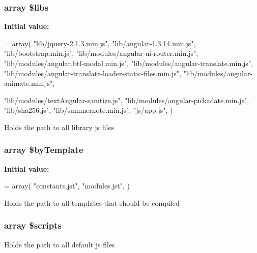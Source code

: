 \subsubsection[{\$libs}]{\setlength{\rightskip}{0pt plus 5cm}array \$libs\hspace{0.3cm}{\ttfamily [static]}}\label{class_scripts_af921b61f4c24e9526d11cb2e6e274f80}
{\bfseries Initial value\+:}
\begin{DoxyCode}
= array(
        \textcolor{stringliteral}{"lib/jquery-2.1.3.min.js"},
        \textcolor{stringliteral}{"lib/angular-1.3.14.min.js"},
        \textcolor{stringliteral}{"lib/bootstrap.min.js"},
        \textcolor{stringliteral}{"lib/modules/angular-ui-router.min.js"},
        \textcolor{stringliteral}{"lib/modules/angular.btf-modal.min.js"},
        \textcolor{stringliteral}{"lib/modules/angular-translate.min.js"},
        \textcolor{stringliteral}{"lib/modules/angular-translate-loader-static-files.min.js"},
        \textcolor{stringliteral}{"lib/modules/angular-animate.min.js"},
        
        \textcolor{stringliteral}{"lib/modules/textAngular-sanitize.js"},
        \textcolor{stringliteral}{"lib/modules/angular-pickadate.min.js"},
        \textcolor{stringliteral}{"lib/sha256.js"},
        \textcolor{stringliteral}{"lib/summernote.min.js"},
        \textcolor{stringliteral}{"js/app.js"}, 
    )
\end{DoxyCode}
Holds the path to all library js files \hypertarget{class_scripts_a22413c56163c8bf737718cd76a078b5c}{}
\subsubsection[{\$by\+Template}]{\setlength{\rightskip}{0pt plus 5cm}array \$by\+Template\hspace{0.3cm}{\ttfamily [static]}}\label{class_scripts_a22413c56163c8bf737718cd76a078b5c}
{\bfseries Initial value\+:}
\begin{DoxyCode}
= array(
        \textcolor{stringliteral}{"constants.jst"},
        \textcolor{stringliteral}{"modules.jst"},
    )
\end{DoxyCode}
Holds the path to all templates that should be compiled \hypertarget{class_scripts_ac1a0c3c8e4bbd9bc1a22d6147a839d75}{}
\subsubsection[{\$scripts}]{\setlength{\rightskip}{0pt plus 5cm}array \$scripts\hspace{0.3cm}{\ttfamily [static]}}\label{class_scripts_ac1a0c3c8e4bbd9bc1a22d6147a839d75}
Holds the path to all default js files \hypertarget{class_scripts_ab2cede1cb181d8cd87d9a8f5570aa121}{}
